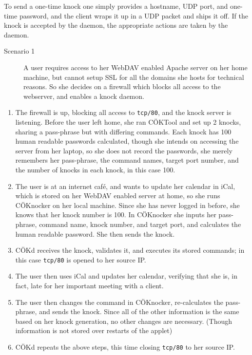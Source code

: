\documentclass[landscape,twocolumn,headrule]{foils}
\begin{document}
To send a one-time knock one simply provides a hostname,  UDP port, and one-time password, and the client wraps it up in a UDP packet and ships it off.  If the knock is accepted by the daemon, the appropriate actions are taken by the daemon.


\begin{description}
\item[Scenario 1] A user requires access to her WebDAV enabled Apache server on her home machine, but cannot setup SSL for all the domains she hosts for technical reasons.  So she decides on a firewall which blocks all access to the webserver, and enables a knock daemon.
\end{description}

\begin{enumerate}
\item The firewall is up, blocking all access to \texttt{tcp/80}, and the knock server is listening.  Before the user left home, she ran C\"{O}KTool and set up 2 knocks, sharing a pass-phrase but with differing commands.  Each knock has 100 human readable passwords calculated, though she intends on accessing the server from her laptop, so she does not record the passwords, she merely remembers her pass-phrase, the command names, target port number, and the number of knocks in each knock, in this case 100.


\item The user is at an internet caf\'{e}, and wants to update her calendar in iCal, which is stored on her WebDAV enabled server at home, so she runs C\"{O}Knocker on her local machine.  Since she has never logged in before, she knows that her knock number is 100.  In C\"{O}Knocker she inputs her pass-phrase, command name, knock number, and target port, and calculates the human readable password.  She then sends the knock.
\item C\"{O}Kd receives the knock, validates it, and executes its stored commands; in this case \texttt{tcp/80} is opened to her source IP.
\item The user then uses iCal and updates her calendar, verifying that she is, in fact, late for her important meeting with a client.
\item The user then changes the command in C\"{O}Knocker, re-calculates the pass-phrase, and sends the knock.  Since all of the other information is the same based on her knock generation, no other changes are necessary.  (Though information is not stored over restarts of the applet)
\item C\"{O}Kd repeats the above steps, this time closing \texttt{tcp/80} to her source IP.
\end{enumerate}
\end{document}
